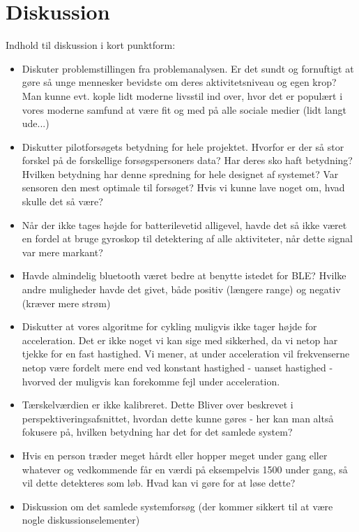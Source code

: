 \section{Diskussion}\label{sec:diskussion}

Indhold til diskussion i kort punktform:
\begin{itemize}
	\item Diskuter problemstillingen fra problemanalysen. Er det sundt og fornuftigt at gøre så unge mennesker bevidste om deres aktivitetsniveau og egen krop? Man kunne evt. kople lidt moderne livsstil ind over, hvor det er populært i vores moderne samfund at være fit og med på alle sociale medier (lidt langt ude...)
	\item Diskutter pilotforsøgets betydning for hele projektet. Hvorfor er der så stor forskel på de forskellige forsøgspersoners data? Har deres sko haft betydning? Hvilken betydning har denne spredning for hele designet af systemet? Var sensoren den mest optimale til forsøget? Hvis vi kunne lave noget om, hvad skulle det så være?
	\item Når der ikke tages højde for batterilevetid alligevel, havde det så ikke været en fordel at bruge gyroskop til detektering af alle aktiviteter, når dette signal var mere markant? 
	\item Havde almindelig bluetooth været bedre at benytte istedet for BLE? Hvilke andre muligheder havde det givet, både positiv (længere range) og negativ (kræver mere strøm)
	\item Diskutter at vores algoritme for cykling muligvis ikke tager højde for acceleration. Det er ikke noget vi kan sige med sikkerhed, da vi netop har tjekke for en fast hastighed. Vi mener, at under acceleration vil frekvenserne netop være fordelt mere end ved konstant hastighed - uanset hastighed - hvorved der muligvis kan forekomme fejl under acceleration.
	\item Tærskelværdien er ikke kalibreret. Dette Bliver over beskrevet i perspektiveringsafsnittet, hvordan dette kunne gøres - her kan man altså fokusere på, hvilken betydning har det for det samlede system?
	\item Hvis en person træder meget hårdt eller hopper meget under gang eller whatever og vedkommende får en værdi på eksempelvis 1500 under gang, så vil dette detekteres som løb. Hvad kan vi gøre for at løse dette?
	\item Diskussion om det samlede systemforsøg (der kommer sikkert til at være nogle diskussionselementer)
\end{itemize}
